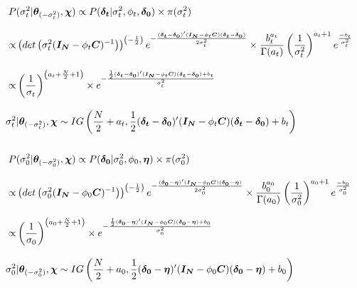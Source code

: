 \documentclass[12pt,a4paper]{article}
\begin{document}
\begin{CJK}{UTF8}{bkai}
\begin{align*}
\\ \hspace*{\fill} \\
   P & (\sigma_t^2|\bm{\theta}_{(-\sigma_t^2)},\bm{\chi}) \propto  P(\bm{\delta_{t}}|\sigma_t^2,\phi_t,\bm{\delta_0}) \times \pi(\sigma_t^2)  \\[3mm]
 \propto &
\left(det\left(\sigma_t^2(\bm{I_N}-\phi_t\bm{C})^{-1}\right)\right)^{\left(-\frac{1}{2}\right)} e^{-\frac{(\bm{\delta_t}-\bm{\delta_0})^\prime(\bm{I_N}-\phi_t\bm{C})(\bm{\delta_t}-\bm{\delta_0})}{2\sigma_t^2}} \times \frac{b_t^{a_t}}{\Gamma(a_t)}\left(\frac{1}{\sigma_t^2}\right)^{a_t+1}e^{\frac{-b_t}{\sigma_t^2}}\\[3mm]
 \propto &
 \left(\frac{1}{\sigma_t}\right)^{\left(a_t+\frac{N}{2}+1\right)} \times e^{-\frac{\frac{1}{2}(\bm{\delta_t}-\bm{\delta_0})^\prime(\bm{I_N}-\phi_t\bm{C})(\bm{\delta_t}-\bm{\delta_0})+b_t}{\sigma_t^2}}  \\[3mm]
  \sigma_t^2 & |\bm{\theta}_{(-\sigma_t^2)},\bm{\chi} \sim IG\left(\frac{N}{2}+a_t,\frac{1}{2}(\bm{\delta_t}-\bm{\delta_0})^\prime(\bm{I_N}-\phi_t\bm{C})(\bm{\delta_t}-\bm{\delta_0})+b_t\right)
\\ \hspace*{\fill} \\
    P & (\sigma_0^2|\bm{\theta}_{(-\sigma_0^2)},\bm{\chi}) \propto  P(\bm{\delta_{0}}|\sigma_0^2,\phi_0,\bm{\eta}) \times \pi(\sigma_0^2)  \\[3mm]
 \propto &
\left(det\left(\sigma_0^2(\bm{I_N}-\phi_0\bm{C})^{-1}\right)\right)^{\left(-\frac{1}{2}\right)} e^{-\frac{(\bm{\delta_0}-\bm{\eta})^\prime(\bm{I_N}-\phi_0\bm{C})(\bm{\delta_0}-\bm{\eta})}{2\sigma_0^2}} \times \frac{b_0^{a_0}}{\Gamma(a_0)}\left(\frac{1}{\sigma_0^2}\right)^{a_0+1}e^{\frac{-b_0}{\sigma_0^2}}\\[3mm]
 \propto &
 \left(\frac{1}{\sigma_0}\right)^{\left(a_0+\frac{N}{2}+1\right)} \times e^{-\frac{\frac{1}{2}(\bm{\delta_0}-\bm{\eta})^\prime(\bm{I_N}-\phi_0\bm{C})(\bm{\delta_0}-\bm{\eta})+b_0}{\sigma_0^2}}  \\[3mm]
 \sigma_0^2 & |\bm{\theta}_{(-\sigma_0^2)},\bm{\chi} \sim IG\left(\frac{N}{2}+a_0,\frac{1}{2}(\bm{\delta_0}-\bm{\eta})^\prime(\bm{I_N}-\phi_0\bm{C})(\bm{\delta_0}-\bm{\eta})+b_0\right)
\\ \hspace*{\fill} \\

\end{align*}
\end{CJK}
\end{document}
